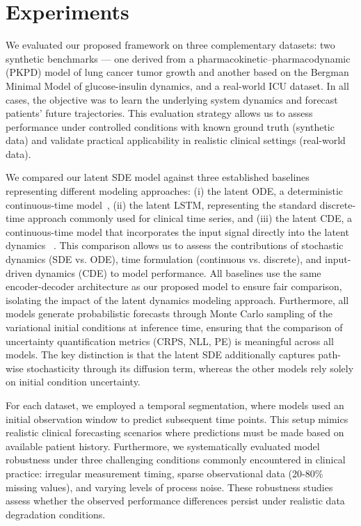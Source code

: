 \documentclass[preprint,12pt]{elsarticle}
\begin{document}
\section{Experiments}
We evaluated our proposed framework on three complementary datasets: two synthetic benchmarks — one derived from a pharmacokinetic–pharmacodynamic (PKPD) model of lung cancer tumor growth and another based on the Bergman Minimal Model of glucose-insulin dynamics, and a real-world ICU dataset. In all cases, the objective was to learn the underlying system dynamics and forecast patients' future trajectories. 
This evaluation strategy allows us to assess performance under controlled conditions with known ground truth (synthetic data) and validate practical applicability in realistic clinical settings (real-world data).

We compared our latent SDE model against three established baselines representing different modeling approaches: (i) the latent ODE, a deterministic continuous-time model~\citep{rubanova2019latent}, (ii) the latent LSTM, representing the standard discrete-time approach commonly used for clinical time series, and (iii) the latent CDE, a continuous-time model that incorporates the input signal directly into the latent dynamics ~\citep{kidger2020neural}.
This comparison allows us to assess the contributions of stochastic dynamics (SDE vs. ODE), time formulation (continuous vs. discrete), and input-driven dynamics (CDE) to model performance. All baselines use the same encoder-decoder architecture as our proposed model to ensure fair comparison, isolating the impact of the latent dynamics modeling approach. Furthermore, all models generate probabilistic forecasts through Monte Carlo sampling of the variational initial conditions at inference time, ensuring that the comparison of uncertainty quantification metrics (CRPS, NLL, PE) is meaningful across all models. The key distinction is that the latent SDE additionally captures path-wise stochasticity through its diffusion term, whereas the other models rely solely on initial condition uncertainty.

For each dataset, we employed a temporal segmentation, where models used an initial observation window to predict subsequent time points. This setup mimics realistic clinical forecasting scenarios where predictions must be made based on available patient history. Furthermore, we systematically evaluated model robustness under three challenging conditions commonly encountered in clinical practice: irregular measurement timing, sparse observational data (20-80\% missing values), and varying levels of process noise. These robustness studies assess whether the observed performance differences persist under realistic data degradation conditions.
\end{document}

